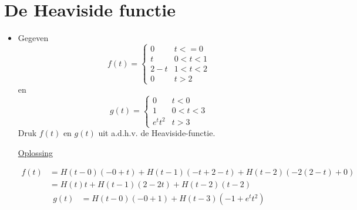 \documentclass[12pt]{report}
\newcommand{\exercise}[2]{
  #1
  

  \underline{Oplossing}
  
  #2
  
  \hrulefill
}
\begin{document}
\section{De Heaviside functie}
\begin{itemize}[label={}]
\item \exercise{Gegeven 
$$f(t) = \begin{cases}
          0 & t < = 0 \\
          t & 0 < t < 1 \\
          2 - t & 1 < t < 2 \\
          0 & t > 2
         \end{cases}
$$ 
en
$$g(t) = \begin{cases}
          0 & t < 0 \\
          1 & 0 < t < 3 \\
          e^tt^2 & t > 3
         \end{cases}
$$
Druk $f(t)$ en $g(t)$ uit a.d.h.v. de Heaviside-functie.}{
\begin{equation*}
 \begin{split}
  f(t) & = H(t- 0)(-0 + t) + H(t - 1)(-t + 2 -t) + H(t - 2)(-2(2-t) + 0) \\
       & = H(t)t + H(t-1)(2-2t) + H(t-2)(t-2)
 \end{split}
\end{equation*}
\begin{equation*}
 \begin{split}
  g(t) & = H(t - 0)(-0 + 1) + H(t - 3)(-1 + e^tt^2)
 \end{split}
\end{equation*}
}


\end{itemize}
\end{document}

